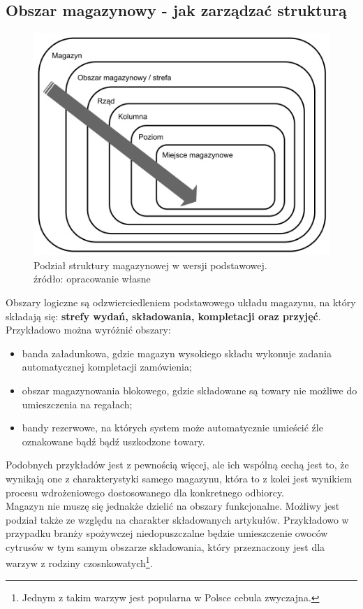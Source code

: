 	\subsection{Obszar magazynowy - jak zarządzać strukturą}	
		\begin{figure}[h]
			\centering
			\includegraphics[width=\textwidth]{images/unit_structure}
			\caption[Podstawowa struktura magazyny]{
					Podział struktury magazynowej w wersji podstawowej. \\
					źródło: opracowanie własne
			}
			\label{fig:c5:unit_structure}
		\end{figure}
		Obszary logiczne są odzwierciedleniem podstawowego układu magazynu, na który składają się:
		\textbf{strefy wydań, składowania, kompletacji oraz przyjęć}. Przykładowo można wyróżnić obszary:
		\begin{itemize}
			\item banda załadunkowa, gdzie magazyn wysokiego składu wykonuje zadania automatycznej kompletacji
			zamówienia;
			\item obszar magazynowania blokowego, gdzie składowane są towary nie możliwe do umieszczenia
			na regałach;
			\item bandy rezerwowe, na których system może automatycznie umieścić źle oznakowane bądź bądź
			uszkodzone towary.
		\end{itemize}
		Podobnych przykładów jest z pewnością więcej, ale ich wspólną cechą jest to, że wynikają one z 
		charakterystyki samego magazynu, która to z kolei jest wynikiem procesu wdrożeniowego dostosowanego
		dla konkretnego odbiorcy.\\
		Magazyn nie muszę się jednakże dzielić na obszary funkcjonalne. Możliwy jest podział także ze względu
		na charakter składowanych artykułów. Przykładowo w przypadku branży spożywczej niedopuszczalne będzie
		umieszczenie owoców cytrusów w tym samym obszarze składowania, który przeznaczony jest dla 
		warzyw z rodziny czosnkowatych\footnote{Jednym z takim warzyw jest popularna w Polsce cebula zwyczajna.}.
